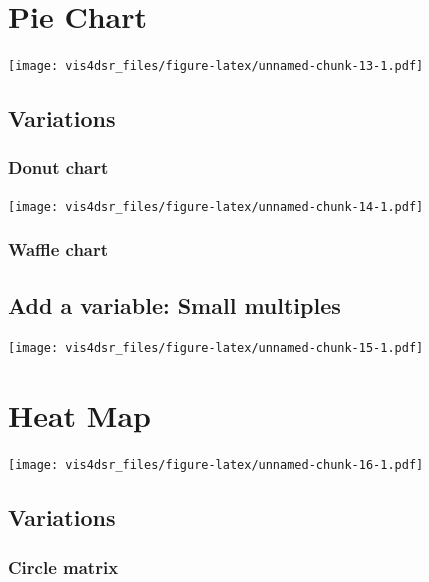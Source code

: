 \documentclass[
]{krantz}
\begin{document}
\hypertarget{pie-chart}{%
\section{Pie Chart}\label{pie-chart}}

\texttt{[image: vis4dsr\_files/figure-latex/unnamed-chunk-13-1.pdf]}

\hypertarget{variations-3}{%
\subsection{Variations}\label{variations-3}}

\hypertarget{donut-chart}{%
\subsubsection{Donut chart}\label{donut-chart}}

\texttt{[image: vis4dsr\_files/figure-latex/unnamed-chunk-14-1.pdf]}

\hypertarget{waffle-chart}{%
\subsubsection{Waffle chart}\label{waffle-chart}}

\hypertarget{add-a-variable-small-multiples}{%
\subsection{Add a variable: Small multiples}\label{add-a-variable-small-multiples}}

\texttt{[image: vis4dsr\_files/figure-latex/unnamed-chunk-15-1.pdf]}

\hypertarget{heat-map}{%
\section{Heat Map}\label{heat-map}}

\texttt{[image: vis4dsr\_files/figure-latex/unnamed-chunk-16-1.pdf]}

\hypertarget{variations-4}{%
\subsection{Variations}\label{variations-4}}

\hypertarget{circle-matrix}{%
\subsubsection{Circle matrix}\label{circle-matrix}}
\end{document}
